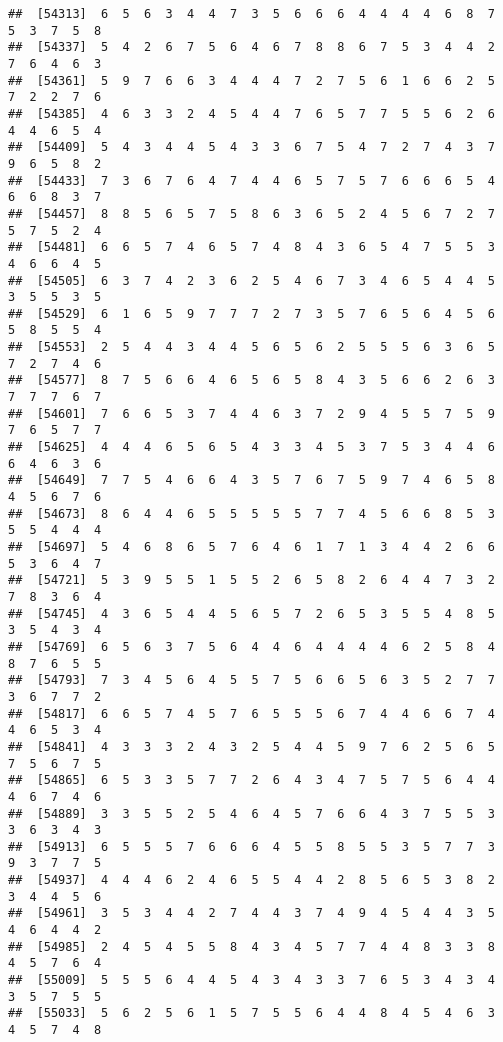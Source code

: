 \documentclass[
]{book}
\begin{document}
\begin{verbatim}
##  [54313]  6  5  6  3  4  4  7  3  5  6  6  6  4  4  4  4  6  8  7  5  3  7  5  8
##  [54337]  5  4  2  6  7  5  6  4  6  7  8  8  6  7  5  3  4  4  2  7  6  4  6  3
##  [54361]  5  9  7  6  6  3  4  4  4  7  2  7  5  6  1  6  6  2  5  7  2  2  7  6
##  [54385]  4  6  3  3  2  4  5  4  4  7  6  5  7  7  5  5  6  2  6  4  4  6  5  4
##  [54409]  5  4  3  4  4  5  4  3  3  6  7  5  4  7  2  7  4  3  7  9  6  5  8  2
##  [54433]  7  3  6  7  6  4  7  4  4  6  5  7  5  7  6  6  6  5  4  6  6  8  3  7
##  [54457]  8  8  5  6  5  7  5  8  6  3  6  5  2  4  5  6  7  2  7  5  7  5  2  4
##  [54481]  6  6  5  7  4  6  5  7  4  8  4  3  6  5  4  7  5  5  3  4  6  6  4  5
##  [54505]  6  3  7  4  2  3  6  2  5  4  6  7  3  4  6  5  4  4  5  3  5  5  3  5
##  [54529]  6  1  6  5  9  7  7  7  2  7  3  5  7  6  5  6  4  5  6  5  8  5  5  4
##  [54553]  2  5  4  4  3  4  4  5  6  5  6  2  5  5  5  6  3  6  5  7  2  7  4  6
##  [54577]  8  7  5  6  6  4  6  5  6  5  8  4  3  5  6  6  2  6  3  7  7  7  6  7
##  [54601]  7  6  6  5  3  7  4  4  6  3  7  2  9  4  5  5  7  5  9  7  6  5  7  7
##  [54625]  4  4  4  6  5  6  5  4  3  3  4  5  3  7  5  3  4  4  6  6  4  6  3  6
##  [54649]  7  7  5  4  6  6  4  3  5  7  6  7  5  9  7  4  6  5  8  4  5  6  7  6
##  [54673]  8  6  4  4  6  5  5  5  5  5  7  7  4  5  6  6  8  5  3  5  5  4  4  4
##  [54697]  5  4  6  8  6  5  7  6  4  6  1  7  1  3  4  4  2  6  6  5  3  6  4  7
##  [54721]  5  3  9  5  5  1  5  5  2  6  5  8  2  6  4  4  7  3  2  7  8  3  6  4
##  [54745]  4  3  6  5  4  4  5  6  5  7  2  6  5  3  5  5  4  8  5  3  5  4  3  4
##  [54769]  6  5  6  3  7  5  6  4  4  6  4  4  4  4  6  2  5  8  4  8  7  6  5  5
##  [54793]  7  3  4  5  6  4  5  5  7  5  6  6  5  6  3  5  2  7  7  3  6  7  7  2
##  [54817]  6  6  5  7  4  5  7  6  5  5  5  6  7  4  4  6  6  7  4  4  6  5  3  4
##  [54841]  4  3  3  3  2  4  3  2  5  4  4  5  9  7  6  2  5  6  5  7  5  6  7  5
##  [54865]  6  5  3  3  5  7  7  2  6  4  3  4  7  5  7  5  6  4  4  4  6  7  4  6
##  [54889]  3  3  5  5  2  5  4  6  4  5  7  6  6  4  3  7  5  5  3  3  6  3  4  3
##  [54913]  6  5  5  5  7  6  6  6  4  5  5  8  5  5  3  5  7  7  3  9  3  7  7  5
##  [54937]  4  4  4  6  2  4  6  5  5  4  4  2  8  5  6  5  3  8  2  3  4  4  5  6
##  [54961]  3  5  3  4  4  2  7  4  4  3  7  4  9  4  5  4  4  3  5  4  6  4  4  2
##  [54985]  2  4  5  4  5  5  8  4  3  4  5  7  7  4  4  8  3  3  8  4  5  7  6  4
##  [55009]  5  5  5  6  4  4  5  4  3  4  3  3  7  6  5  3  4  3  4  3  5  7  5  5
##  [55033]  5  6  2  5  6  1  5  7  5  5  6  4  4  8  4  5  4  6  3  4  5  7  4  8

\end{verbatim}
\end{document}
